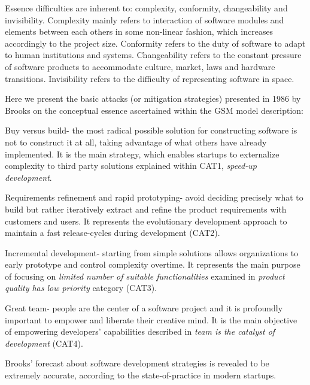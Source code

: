 \documentclass[10pt,journal,letterpaper,compsoc]{IEEEtran}
\begin{document}
Essence difficulties are inherent to: complexity, conformity, changeability and 
invisibility. Complexity  mainly refers to interaction of software modules and 
elements between each others in some non-linear fashion, which increases 
accordingly to the project size. Conformity refers to the duty of software to 
adapt to human institutions and systems. Changeability  refers to the constant 
pressure of software products to accommodate culture, market, laws and hardware 
transitions. Invisibility  refers to the difficulty of representing software in 
space. 

Here we present the basic attacks (or mitigation strategies) presented in 1986 
by Brooks on the conceptual essence ascertained within the GSM model 
description:


\begin{compactitem}

\item Buy versus build-  the most radical possible solution for constructing 
software is not to construct it at all, taking advantage of what others have 
already implemented. It is the main strategy, which enables startups to 
externalize complexity to third party solutions explained within CAT1,  
\textit{speed-up development}.
\item Requirements refinement and rapid prototyping- avoid deciding precisely 
what to build but rather iteratively extract and refine the product requirements 
with customers and users. It represents the evolutionary development approach to 
maintain a fast release-cycles during development (CAT2).
\item Incremental development- starting from simple solutions allows 
organizations to early prototype and control complexity overtime. It represents 
the main purpose of focusing on \textit{limited number of suitable 
functionalities} examined in \textit{product quality has low priority}  category 
(CAT3).
\item Great team- people are the center of a software project and it is 
profoundly important to empower and liberate their creative mind. It is the main 
objective of empowering developers' capabilities described in \textit{team is 
the catalyst of development} (CAT4).
\end{compactitem}

Brooks' forecast about software development strategies is revealed to be 
extremely accurate, according to the state-of-practice in modern startups.
\end{document}
